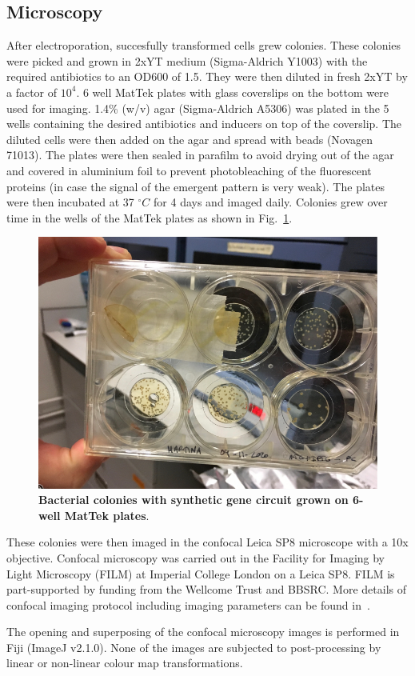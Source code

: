 \subsection{Microscopy}\label{microscopy}
After electroporation, succesfully transformed cells grew colonies. These colonies were picked and grown in 2xYT medium (Sigma-Aldrich Y1003) with the required antibiotics to an OD600 of 1.5. They were then diluted in fresh 2xYT by a factor of $10^4$.
6 well MatTek plates with glass coverslips on the bottom were used for imaging.
1.4\% (w/v) agar (Sigma-Aldrich A5306) was plated in the 5 wells containing the desired antibiotics and inducers on top of the coverslip.
The diluted cells were then added on the agar and spread with beads (Novagen 71013).
The plates were then sealed in parafilm to avoid drying out of the agar and covered in aluminium foil to prevent photobleaching of the fluorescent proteins (in case the signal of the emergent pattern is very weak).
The plates were then incubated at 37 $^{\circ} C$ for 4 days and imaged daily.
Colonies grew over time in the wells of the MatTek plates as shown in Fig.~\ref{matek}.

\begin{figure}[H]

    \includegraphics[width=1\textwidth]{chapters/Methods/matek}
    \caption{\textbf{Bacterial colonies with synthetic gene circuit grown on 6-well MatTek plates}.}
    \label{matek}
\end{figure}

These colonies were then imaged in the confocal Leica SP8 microscope with a 10x objective.
Confocal microscopy was carried out in the Facility for Imaging by Light Microscopy (FILM) at Imperial College London on a Leica SP8.
FILM is part-supported by funding from the Wellcome Trust and BBSRC.
More details of confocal imaging protocol including imaging parameters can be found in~\parencite{Tica2020}.

The opening and superposing of the confocal microscopy images is performed in Fiji (ImageJ v2.1.0).
None of the images are subjected to post-processing by linear or non-linear colour map transformations.

